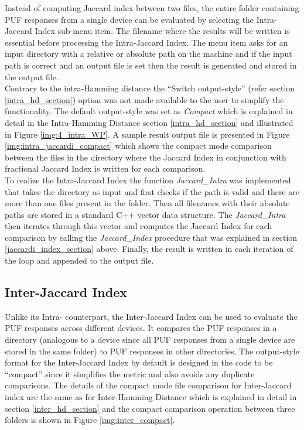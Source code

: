 Instead of computing Jaccard index between two files, the entire folder containing PUF responses from a single device can be evaluated by selecting the Intra-Jaccard Index sub-menu item. The filename where the results will be written is essential before processing the Intra-Jaccard Index. The menu item asks for an input directory with a relative or absolute path on the machine and if the input path is correct and an output file is set then the result is generated and stored in the
output file.\\

Contrary to the intra-Hamming distance the ``Switch output-style'' (refer section \ref{intra_hd_section}) option was not made available to the user to simplify the functionality. The default output-style was set as \emph{Compact} which is explained in detail in the Intra-Hamming Distance section \ref{intra_hd_section} and illustrated in Figure \ref{img:4_intra_WP}. A sample result output file is presented in Figure \ref{img:intra_jaccardi_compact} which shows the compact mode comparison between the files in the
directory where the Jaccard Index in conjunction with fractional Jaccard Index is written for each comparison.\\

To realize the Intra-Jaccard Index the function \emph{Jaccard\_Intra} was implemented that takes the directory as input and first checks if the path is valid and there are more than one files present in the folder. Then all filenames with their absolute paths are stored in a standard C++ vector data structure. The \emph{Jaccard\_Intra} then iterates through this vector and computes the Jaccard Index for each comparison by calling the \emph{Jaccard\_Index} procedure that was explained in  section
\ref{jaccardi_index_section}
above. Finally, the result is written in each iteration of the loop and appended to the output file.\\

\subsection{Inter-Jaccard Index}
Unlike its Intra- counterpart, the Inter-Jaccard Index can be used to evaluate the PUF responses across different devices. It compares the PUF responses in a directory (analogous to a device since all PUF responses from a single device are stored in the same folder) to PUF responses in other directories. The output-style format for the Inter-Jaccard Index by default is designed in the code to be ``compact'' since it simplifies the metric and also avoids any duplicate comparisons. The details of
the compact mode file comparison for Inter-Jaccard index are the same as for Inter-Hamming Distance which is explained in detail in section \ref{inter_hd_section} and the  compact comparison operation between three folders is shown in Figure \ref{img:inter_compact}.\\

